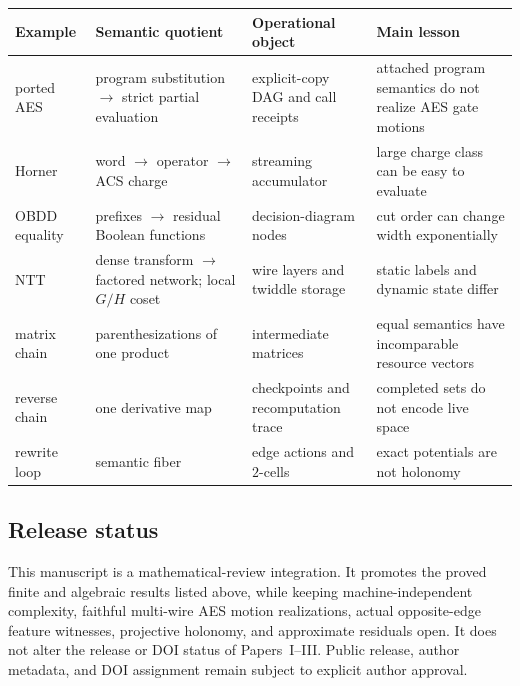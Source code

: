 \begin{center}
\begin{tabular}{L{0.17\textwidth}L{0.23\textwidth}L{0.23\textwidth}L{0.25\textwidth}}
\toprule
Example & Semantic quotient & Operational object & Main lesson\\
\midrule
ported AES & program substitution $\to$ strict partial evaluation & explicit-copy DAG and call receipts & attached program semantics do not realize AES gate motions\\
Horner & word $\to$ operator $\to$ ACS charge & streaming accumulator & large charge class can be easy to evaluate\\
OBDD equality & prefixes $\to$ residual Boolean functions & decision-diagram nodes & cut order can change width exponentially\\
NTT & dense transform $\to$ factored network; local $G/H$ coset & wire layers and twiddle storage & static labels and dynamic state differ\\
matrix chain & parenthesizations of one product & intermediate matrices & equal semantics have incomparable resource vectors\\
reverse chain & one derivative map & checkpoints and recomputation trace & completed sets do not encode live space\\
rewrite loop & semantic fiber & edge actions and $2$-cells & exact potentials are not holonomy\\
\bottomrule
\end{tabular}
\end{center}

\subsection{Release status}

This manuscript is a mathematical-review integration.  It promotes the proved
finite and algebraic results listed above, while keeping machine-independent
complexity, faithful multi-wire AES motion realizations, actual opposite-edge
feature witnesses, projective holonomy, and approximate residuals open.
It does not alter the release or DOI status of Papers~I--III.  Public release,
author metadata, and DOI assignment remain subject to explicit author approval.
